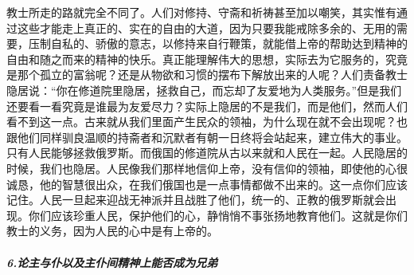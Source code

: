 \par 教士所走的路就完全不同了。人们对修持、守斋和祈祷甚至加以嘲笑，其实惟有通过这些才能走上真正的、实在的自由的大道，因为只要我能戒除多余的、无用的需要，压制自私的、骄傲的意志，以修持来自行鞭策，就能借上帝的帮助达到精神的自由和随之而来的精神的快乐。真正能理解伟大的思想，实际去为它服务的，究竟是那个孤立的富翁呢？还是从物欲和习惯的摆布下解放出来的人呢？人们责备教士隐居说：“你在修道院里隐居，拯救自己，而忘却了友爱地为人类服务。”但是我们还要看一看究竟是谁最为友爱尽力？实际上隐居的不是我们，而是他们，然而人们看不到这一点。古来就从我们里面产生民众的领袖，为什么现在就不会出现呢？也跟他们同样驯良温顺的持斋者和沉默者有朝一日终将会站起来，建立伟大的事业。只有人民能够拯救俄罗斯。而俄国的修道院从古以来就和人民在一起。人民隐居的时候，我们也隐居。人民像我们那样地信仰上帝，没有信仰的领袖，即使他的心很诚恳，他的智慧很出众，在我们俄国也是一点事情都做不出来的。这一点你们应该记住。人民一旦起来迎战无神派并且战胜了他们，统一的、正教的俄罗斯就会出现。你们应该珍重人民，保护他们的心，静悄悄不事张扬地教育他们。这就是你们教士的义务，因为人民的心中是有上帝的。
\subparagraph*{6.论主与仆以及主仆间精神上能否成为兄弟}
